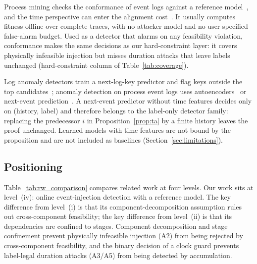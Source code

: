 \documentclass[manuscript,screen,review]{acmart}
\begin{document}
Process mining checks the conformance of event logs against a reference model~\cite{aalst2012replay,adriansyah2011conformance}, and the time perspective can enter the alignment cost~\cite{rino2024timed}. It usually computes fitness offline over complete traces, with no attacker model and no user-specified false-alarm budget. Used as a detector that alarms on any feasibility violation, conformance makes the same decisions as our hard-constraint layer: it covers physically infeasible injection but misses duration attacks that leave labels unchanged (hard-constraint column of Table~\ref{tab:coverage}).

Log anomaly detectors train a next-log-key predictor and flag keys outside the top candidates~\cite{du2017deeplog,meng2019loganomaly,landauer2023deep}; anomaly detection on process event logs uses autoencoders~\cite{nolle2018analyzing} or next-event prediction~\cite{nolle2022binet}. A next-event predictor without time features decides only on (history, label) and therefore belongs to the label-only detector family: replacing the predecessor $i$ in Proposition~\ref{prop:ta} by a finite history leaves the proof unchanged. Learned models with time features are not bound by the proposition and are not included as baselines (Section~\ref{sec:limitations}).

\subsection{Positioning}
\label{sec:rw_position}

Table~\ref{tab:rw_comparison} compares related work at four levels. Our work sits at level~(iv): online event-injection detection with a reference model. The key difference from level~(i) is that its component-decomposition assumption rules out cross-component feasibility; the key difference from level~(ii) is that its dependencies are confined to stages. Component decomposition and stage confinement prevent physically infeasible injection ({A2}) from being rejected by cross-component feasibility, and the binary decision of a clock guard prevents label-legal duration attacks ({A3}/{A5}) from being detected by accumulation.
\end{document}
